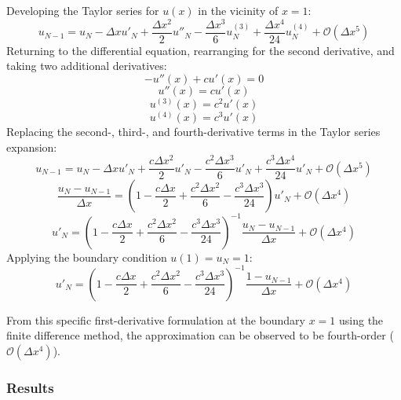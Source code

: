 \documentclass[10pt, reqno]{article}		%
\numberwithin{equation}{section}
\begin{document}
Developing the Taylor series for $u(x)$ in the vicinity of $x = 1$:
\begin{equation}
u_{N-1} = u_N - \Delta x u'_N + \frac{\Delta x^2}{2} u''_N - \frac{\Delta x^3}{6} u^{(3)}_N + \frac{\Delta x^4}{24} u^{(4)}_N + \mathcal{O}(\Delta x^5)
\end{equation}
Returning to the differential equation, rearranging for the second derivative, and taking two additional derivatives:
\begin{equation}
-u''(x)+cu'(x)=0
\end{equation}
\begin{equation}
u''(x)=cu'(x)
\end{equation}
\begin{equation}
u^{(3)}(x)=c^2u'(x)
\end{equation}
\begin{equation}
u^{(4)}(x)=c^3u'(x)
\end{equation}
Replacing the second-, third-, and fourth-derivative terms in the Taylor series expansion: 
\begin{equation}
u_{N-1} = u_N - \Delta x u'_N + \frac{c\Delta x^2}{2} u'_N - \frac{c^2\Delta x^3}{6} u'_N + \frac{c^3\Delta x^4}{24} u'_N + \mathcal{O}(\Delta x^5)
\end{equation}
\begin{equation}
\frac{u_{N}-u_{N-1}}{\Delta x} = \left(1 - \frac{c\Delta x}{2} + \frac{c^2\Delta x^2}{6} - \frac{c^3\Delta x^3}{24} \right)u'_N + \mathcal{O}(\Delta x^4)
\end{equation}
\begin{equation}
u'_N = \left(1 - \frac{c\Delta x}{2} + \frac{c^2\Delta x^2}{6} - \frac{c^3\Delta x^3}{24} \right)^{-1}\frac{u_{N}-u_{N-1}}{\Delta x} + \mathcal{O}(\Delta x^4)
\end{equation}
Applying the boundary condition $u(1) = u_N = 1$:
\begin{equation}
u'_N = \left(1 - \frac{c\Delta x}{2} + \frac{c^2\Delta x^2}{6} - \frac{c^3\Delta x^3}{24} \right)^{-1}\frac{1-u_{N-1}}{\Delta x} + \mathcal{O}(\Delta x^4)
\end{equation}

From this specific first-derivative formulation at the boundary $x = 1$ using the finite difference method, the approximation can be observed to be fourth-order ($\mathcal{O}(\Delta x^4)$).

\newpage

\subsubsection{Results}
\end{document}
